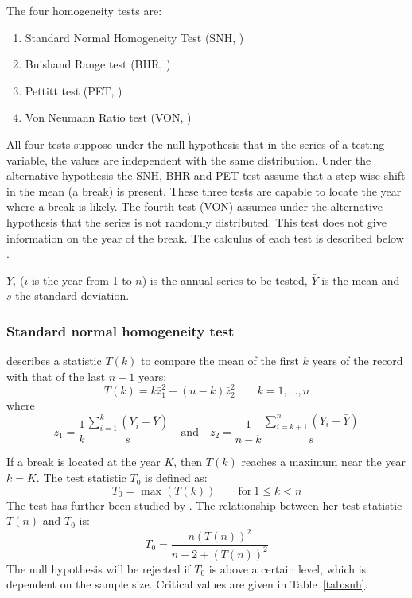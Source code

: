 \documentclass[a4paper,11pt]{article}
\begin{document}
The four homogeneity tests are:
\begin{enumerate}
\item Standard Normal Homogeneity Test (SNH, \citet{alexandersson})
\item Buishand Range test (BHR, \citet{buishand1982})
\item Pettitt test (PET, \citet{pettitt})
\item Von Neumann Ratio test (VON, \citet{vonneumann})
\end{enumerate}
All four tests suppose under the null hypothesis that in the series of
a testing variable, the values are independent with the same
distribution. Under the alternative hypothesis the SNH, BHR and PET
test assume that a step-wise shift in the mean (a break) is
present. These three tests are capable to locate the year where a
break is likely. The fourth test (VON) assumes under the alternative
hypothesis that the series is not randomly distributed. This test does
not give information on the year of the break. The calculus of each
test is described below \citep[from][]{wijngaard}.

$Y_i$ ($i$ is the year from 1 to $n$) is the annual series to be
tested, $\bar{Y}$ is the mean and $s$ the standard deviation.

\subsubsection{Standard normal homogeneity test}
\label{sec:snh}

\citet{alexandersson} describes a statistic $T(k)$ to compare the mean
of the first $k$ years of the record with that of the last $n-1$
years:
\begin{equation*}
T(k) = k \bar{z}_1^2 + (n-k) \bar{z}_2^2 \qquad k=1,\ldots,n
\end{equation*}
where
\begin{equation*}
\bar{z}_1 =
\frac{1}{k}\frac{\sum_{i=1}^{k}(Y_i-\bar{Y})}{s} \quad
\mathrm{and} \quad
\bar{z}_2 = \frac{1}{n-k}\frac{\sum_{i=k+1}^{n}(Y_i - \bar{Y})}{s}
\end{equation*}

If a break is located at the year $K$, then $T(k)$ reaches a maximum
near the year $k=K$. The test statistic $T_0$ is defined as:
\begin{equation*}
T_0 = \max \left(T(k)\right) \qquad \mathrm{for}\: 1 \leq k < n
\end{equation*}
The test has further been studied by \citet{jaruskova}. The
relationship between her test statistic $T(n)$ and $T_0$ is:
\begin{equation*}
T_0 = \frac{n(T(n))^2}{n - 2 + (T(n))^2}
\end{equation*}
The null hypothesis will be rejected if $T_0$ is above a certain
level, which is dependent on the sample size. Critical values are
given in Table~\ref{tab:snh}.
\end{document}
